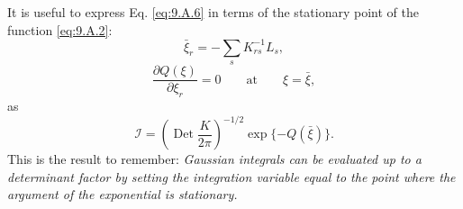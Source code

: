 It is useful to express Eq. \eqref{eq:9.A.6} in terms of the stationary point of the
function \eqref{eq:9.A.2}:
\begin{equation}
  \bar\xi_r=-\sum_sK^{-1}_{rs}L_s,
  \tag{9.A.7}\label{eq:9.A.7}
\end{equation}
\begin{equation}
  \frac{\partial Q(\xi)}{\partial\xi_r}=0
  \qquad\text{at}\qquad \xi=\bar\xi,
  \tag{9.A.8}\label{eq:9.A.8}
\end{equation}
as
\begin{equation}
  \mathcal{I}=\left(\operatorname{Det}\frac{K}{2\pi}\right)^{-1/2}
  \exp\{-Q(\bar\xi)\}.
  \tag{9.A.9}\label{eq:9.A.9}
\end{equation}
This is the result to remember: \emph{Gaussian integrals can be evaluated up
to a determinant factor by setting the integration variable equal to the
point where the argument of the exponential is stationary.}

